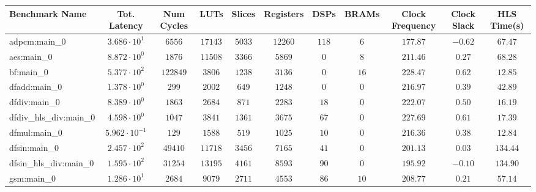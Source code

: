 \begin{tabular}{|l|c|c|c|c|c|c|c|c|c|c|}
\hline
Benchmark Name          & Tot. Latency            & Num Cycles & LUTs       & Slices    & Registers & DSPs    & BRAMs   & Clock Frequency & Clock Slack & HLS Time(s) \\
\hline
adpcm:main\_0           & $ 3.686 \cdot 10^{1}  $ & $ 6556   $ & $ 17143  $ & $ 5033  $ & $ 12260 $ & $ 118 $ & $ 6   $ & $ 177.87      $ & $ -0.62   $ & $ 67.47   $ \\
aes:main\_0             & $ 8.872 \cdot 10^{0}  $ & $ 1876   $ & $ 11508  $ & $ 3366  $ & $ 5869  $ & $ 0   $ & $ 8   $ & $ 211.46      $ & $ 0.27    $ & $ 68.28   $ \\
bf:main\_0              & $ 5.377 \cdot 10^{2}  $ & $ 122849 $ & $ 3806   $ & $ 1238  $ & $ 3136  $ & $ 0   $ & $ 16  $ & $ 228.47      $ & $ 0.62    $ & $ 12.85   $ \\
dfadd:main\_0           & $ 1.378 \cdot 10^{0}  $ & $ 299    $ & $ 2002   $ & $ 649   $ & $ 1248  $ & $ 0   $ & $ 0   $ & $ 216.97      $ & $ 0.39    $ & $ 42.89   $ \\
dfdiv:main\_0           & $ 8.389 \cdot 10^{0}  $ & $ 1863   $ & $ 2684   $ & $ 871   $ & $ 2283  $ & $ 18  $ & $ 0   $ & $ 222.07      $ & $ 0.50    $ & $ 16.19   $ \\
dfdiv\_hls\_div:main\_0 & $ 4.598 \cdot 10^{0}  $ & $ 1047   $ & $ 3841   $ & $ 1361  $ & $ 3675  $ & $ 67  $ & $ 0   $ & $ 227.69      $ & $ 0.61    $ & $ 17.39   $ \\
dfmul:main\_0           & $ 5.962 \cdot 10^{-1} $ & $ 129    $ & $ 1588   $ & $ 519   $ & $ 1025  $ & $ 10  $ & $ 0   $ & $ 216.36      $ & $ 0.38    $ & $ 12.84   $ \\
dfsin:main\_0           & $ 2.457 \cdot 10^{2}  $ & $ 49410  $ & $ 11718  $ & $ 3456  $ & $ 7165  $ & $ 41  $ & $ 0   $ & $ 201.13      $ & $ 0.03    $ & $ 134.44  $ \\
dfsin\_hls\_div:main\_0 & $ 1.595 \cdot 10^{2}  $ & $ 31254  $ & $ 13195  $ & $ 4161  $ & $ 8593  $ & $ 90  $ & $ 0   $ & $ 195.92      $ & $ -0.10   $ & $ 134.90  $ \\
gsm:main\_0             & $ 1.286 \cdot 10^{1}  $ & $ 2684   $ & $ 9079   $ & $ 2711  $ & $ 4553  $ & $ 86  $ & $ 10  $ & $ 208.77      $ & $ 0.21    $ & $ 57.14   $ \\

\end{tabular}
